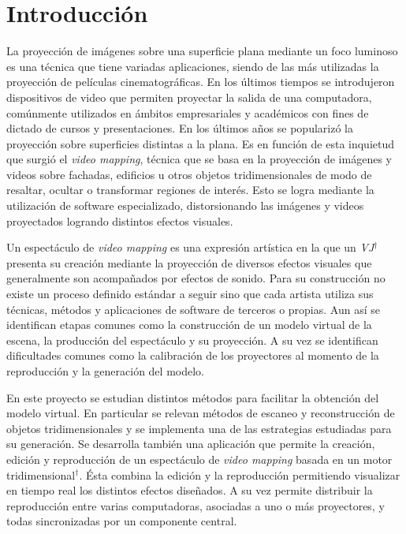 ﻿\chapter{Introducción}


La proyección de imágenes sobre una superficie plana mediante un foco luminoso es una técnica que tiene variadas aplicaciones, siendo de las más utilizadas la proyección de películas cinematográficas. En los últimos tiempos se introdujeron dispositivos de video que permiten proyectar la salida de una computadora, comúnmente utilizados en ámbitos empresariales y académicos con fines de dictado de cursos y presentaciones. En los últimos años se popularizó la proyección sobre superficies distintas a la plana.%
Es en función de esta inquietud que surgió el \emph{video mapping}, técnica que se basa en la proyección de imágenes y videos sobre fachadas, edificios u otros objetos tridimensionales de modo de resaltar, ocultar o transformar regiones de interés. %
Esto se logra mediante la utilización de software especializado, distorsionando las imágenes y videos proyectados logrando distintos efectos visuales.

Un espectáculo de \emph{video mapping} es una expresión artística en la que un \emph{VJ}$^\dagger$ presenta su creación mediante la proyección de diversos efectos visuales que generalmente son acompañados por efectos de sonido. Para su construcción no existe un proceso definido estándar a seguir sino que cada artista utiliza sus técnicas, métodos y aplicaciones de software de terceros o propias. Aun así se identifican etapas comunes como la construcción de un modelo virtual de la escena, la producción del espectáculo y su proyección. A su vez se identifican dificultades comunes como la calibración de los proyectores al momento de la reproducción y la generación del modelo.

En este proyecto se estudian distintos métodos para facilitar la obtención del modelo virtual. En particular se relevan métodos de escaneo y reconstrucción de objetos tridimensionales y se implementa una de las estrategias estudiadas para su generación.%
Se desarrolla también una aplicación que permite la creación, edición y reproducción de un espectáculo de \emph{video mapping} basada en un motor tridimensional$^\dagger$. Ésta combina la edición y la reproducción permitiendo visualizar en tiempo real los distintos efectos diseñados. A su vez permite distribuir la reproducción entre varias computadoras, asociadas a uno o más proyectores, y todas sincronizadas por un componente central.

